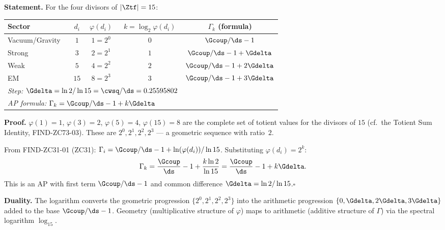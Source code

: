 \documentclass[12pt, a4paper]{article}
\begin{document}
\begin{derivedbox}[title={FIND-ZC73-02: $\varphi(d_i) = 2^k$
  Implies $\Gamma_i$ Is an AP ($R_0$, Exact)}]
\textbf{Statement.}
For the four divisors of $|\Ztf| = 15$:

\medskip
\begin{center}
{\small\renewcommand{\arraystretch}{1.30}
\begin{tabular}{@{}lcccc@{}}
\toprule
Sector & $d_i$ & $\varphi(d_i)$ & $k = \log_2\varphi(d_i)$
  & $\Gamma_k$ (formula) \\
\midrule
Vacuum/Gravity & $1$  & $1 = 2^0$ & $0$ & $\Gcoup/\ds - 1$ \\
Strong         & $3$  & $2 = 2^1$ & $1$ & $\Gcoup/\ds - 1 + \Gdelta$ \\
Weak           & $5$  & $4 = 2^2$ & $2$ & $\Gcoup/\ds - 1 + 2\Gdelta$ \\
EM             & $15$ & $8 = 2^3$ & $3$ & $\Gcoup/\ds - 1 + 3\Gdelta$ \\
\midrule
\multicolumn{4}{l}{\textit{Step: $\Gdelta = \ln2/\ln15 = \cwsq/\ds = 0.25595802$}} & \\
\multicolumn{4}{l}{\textit{AP formula: $\Gamma_k = \Gcoup/\ds - 1 + k\Gdelta$}} & \\
\bottomrule
\end{tabular}
}
\end{center}

\medskip
\textbf{Proof.}
$\varphi(1)=1$, $\varphi(3)=2$, $\varphi(5)=4$, $\varphi(15)=8$
are the complete set of totient values for the divisors of $15$
(cf.\ the Totient Sum Identity, FIND-ZC73-03).
These are $2^0, 2^1, 2^2, 2^3$ --- a geometric sequence with ratio~$2$.

From FIND-ZC31-01 (ZC31):
$\Gamma_i = \Gcoup/\ds - 1 + \ln(\varphi(d_i))/\ln 15$.
Substituting $\varphi(d_i) = 2^k$:
\[
  \Gamma_k
  = \frac{\Gcoup}{\ds} - 1 + \frac{k\ln 2}{\ln 15}
  = \frac{\Gcoup}{\ds} - 1 + k\Gdelta.
\]
This is an AP with first term $\Gcoup/\ds - 1$ and common
difference $\Gdelta = \ln2/\ln15$.\hfill$\square$

\textbf{Duality.}
The logarithm converts the geometric progression
$\{2^0, 2^1, 2^2, 2^3\}$ into the arithmetic progression
$\{0, \Gdelta, 2\Gdelta, 3\Gdelta\}$ added to the base
$\Gcoup/\ds - 1$.
Geometry (multiplicative structure of $\varphi$) maps
to arithmetic (additive structure of $\Gamma$) via the
spectral logarithm $\log_{15}$.
\end{derivedbox}

\end{document}
